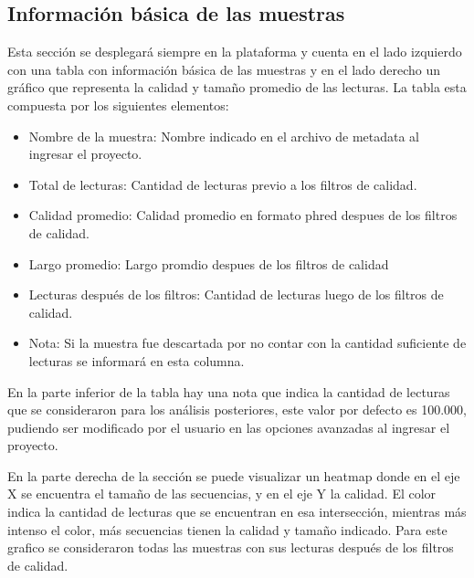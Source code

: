 \subsection{Información básica de las muestras}
Esta sección se desplegará siempre en la plataforma y cuenta en el lado izquierdo con una tabla con información básica de las muestras y en el lado derecho un gráfico que representa la calidad y tamaño promedio de las lecturas.
La tabla esta compuesta por los siguientes elementos:
\begin{itemize}
    \item Nombre de la muestra: Nombre indicado en el archivo de metadata al ingresar el proyecto.
    \item Total de lecturas: Cantidad de lecturas previo a los filtros de calidad.
    \item Calidad promedio: Calidad promedio en formato phred despues de los filtros de calidad.
    \item Largo promedio: Largo promdio despues de los filtros de calidad
    \item Lecturas después de los filtros: Cantidad de lecturas luego de los filtros de calidad.
    \item Nota: Si la muestra fue descartada por no contar con la cantidad suficiente de lecturas se informará en esta columna.
\end{itemize}
En la parte inferior de la tabla hay una nota que indica la cantidad de lecturas que se consideraron para los análisis posteriores, este valor por defecto es 100.000, pudiendo ser modificado por el usuario en las opciones avanzadas al ingresar el proyecto.

En la parte derecha de la sección se puede visualizar un heatmap donde en el eje X se encuentra el tamaño de las secuencias, y en el eje Y la calidad. 
El color indica la cantidad de lecturas que se encuentran en esa intersección, mientras más intenso el color, más secuencias tienen la calidad y tamaño indicado.
Para este grafico se consideraron todas las muestras con sus lecturas después de los filtros de calidad.

